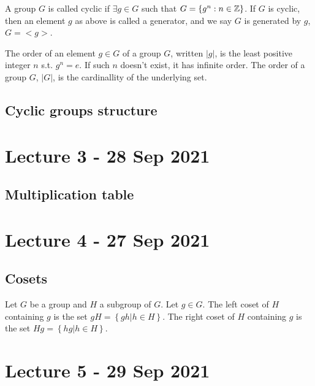 \documentclass[11pt]{scrartcl}
\begin{document}
\begin{definition}
  A group $G$ is called cyclic if $\exists g\in G$ such that $G=\left\{ g^n : n\in\mathbb Z
  \right\}$. If $G$ is cyclic, then an element $g$ as above is called a generator, and we
  say $G$ is generated by $g$, $G=<g>$.
  \label{cyclicGroup}
\end{definition}

\begin{definition}
  The order of an element $g\in G$ of a group $G$, written $|g|$, is the least positive
  integer $n$ s.t. $g^n=e$. If such $n$ doesn't exist, it has infinite order. The order
  of a group $G$, $|G|$, is the cardinallity of the underlying set.
  \label{orderGroup}
\end{definition}

\subsection{Cyclic groups structure}

\section{Lecture 3 - 28 Sep 2021}

\subsection{Multiplication table}

\section{Lecture 4 - 27 Sep 2021}

\subsection{Cosets}

\begin{definition}
  Let $G$ be a group and $H$ a subgroup of $G$. Let $g\in G$. The left coset of $H$
  containing $g$ is the set $gH=\left\{ gh | h\in H \right\}$. The right coset of $H$
  containing $g$ is the set $Hg=\left\{ hg | h\in H \right\}$.
  \label{coset}
\end{definition}

\section{Lecture 5 - 29 Sep 2021}
\end{document}
